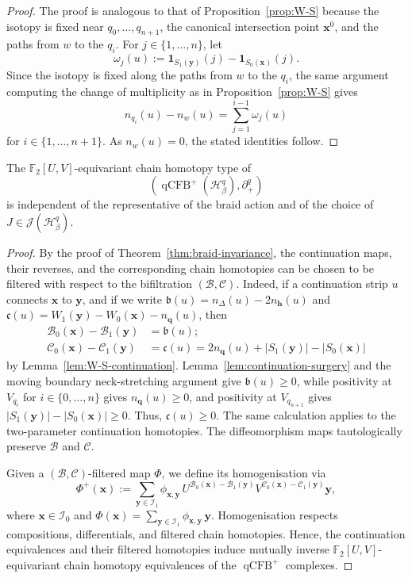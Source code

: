 \documentclass[11pt]{amsart}
\numberwithin{equation}{section}
\numberwithin{figure}{section}
\theoremstyle{definition}
\newcommand{\cB}{\mathcal{B}}
\newcommand{\cC}{\mathcal{C}}
\newcommand{\cH}{\mathcal{H}}
\newcommand{\cI}{\mathcal{I}}
\newcommand{\cJ}{\mathscr{J}}
\newcommand{\bF}{\mathbb{F}}
\newcommand{\fb}{\mathfrak{b}}
\newcommand{\fc}{\mathfrak{c}}
\DeclareMathOperator{\qCFB}{qCFB}
\newcommand{\one}{\boldsymbol{1}}
\newcommand{\hs}{\boldsymbol{h}}
\newcommand{\qs}{\boldsymbol{q}}
\newcommand{\xs}{\boldsymbol{x}}
\newcommand{\ys}{\boldsymbol{y}}
\begin{document}
\begin{proof}
    The proof is analogous to that of Proposition~\ref{prop:W-S} because the isotopy is fixed near $q_0,\dots,q_{n+1}$, the canonical intersection point $\xs^0$, and the paths from $w$ to the $q_i$. For $j \in \{1,\dots,n\}$, let
    \[
    \omega_j(u) := \one_{S_1(\ys)}(j) - \one_{S_0(\xs)}(j).
    \]
    Since the isotopy is fixed along the paths from $w$ to the $q_i$, the same argument computing the change of multiplicity as in Proposition~\ref{prop:W-S} gives
    \[
    n_{q_i}(u) - n_w(u) = \sum_{j=1}^{i-1} \omega_j(u)
    \]
    for $i \in \{1,\dots,n+1\}$. As $n_w(u) = 0$, the stated identities follow.
\end{proof}

\begin{prop}
    The $\bF_2[U,V]$-equivariant chain homotopy type of
    \[
    (\qCFB^+(\cH^q_\beta), \partial^q_+)
    \]
    is independent of the representative of the braid action and of the choice of $J \in \cJ(\cH^q_\beta)$.
\end{prop}

\begin{proof}
    By the proof of Theorem~\ref{thm:braid-invariance}, the continuation maps, their reverses, and the corresponding chain homotopies can be chosen to be filtered with respect to the bifiltration $(\cB, \cC)$. Indeed, if a continuation strip $u$ connects $\xs$ to $\ys$, and if we write $\fb(u) = n_\Delta(u) - 2n_{\hs}(u)$ and $\fc(u) = W_1(\ys) - W_0(\xs) - n_{\qs}(u)$, then
    \[
    \begin{split}
    \cB_0(\xs) - \cB_1(\ys) &= \fb(u); \\
    \cC_0(\xs) - \cC_1(\ys) &= \fc(u) = 2n_{\qs}(u) + |S_1(\ys)| - |S_0(\xs)|
    \end{split}
    \]
    by Lemma~\ref{lem:W-S-continuation}. Lemma~\ref{lem:continuation-surgery} and the moving boundary neck-stretching argument give $\fb(u) \ge 0$, while positivity at $V_{q_i}$ for $i \in \{0,\dots,n\}$ gives $n_{\qs}(u) \ge 0$, and positivity at $V_{q_{n+1}}$ gives $|S_1(\ys)| - |S_0(\xs)| \ge 0$. Thus, $\fc(u) \ge 0$. The same calculation applies to the two-parameter continuation homotopies. The diffeomorphism maps tautologically preserve $\cB$ and $\cC$.
    
    Given a $(\cB, \cC)$-filtered map $\Phi$, we define its homogenisation via
    \[
    \Phi^+(\xs) := \sum_{\ys \in \cI_1} \phi_{\xs,\ys}\, U^{\cB_0(\xs)-\cB_1(\ys)} V^{\cC_0(\xs)-\cC_1(\ys)} \ys,
    \]
    where $\xs \in \cI_0$ and $\Phi(\xs) = \sum_{\ys \in \cI_1} \phi_{\xs,\ys}\, \ys$. Homogenisation respects compositions, differentials, and filtered chain homotopies. Hence, the continuation equivalences and their filtered homotopies induce mutually inverse $\bF_2[U,V]$-equivariant chain homotopy equivalences of the $\qCFB^+$ complexes.
\end{proof}
\end{document}
